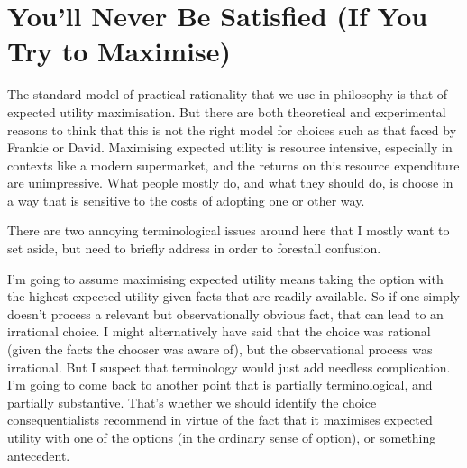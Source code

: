 \documentclass[
  12pt,
  letterpaper,
]{scrbook}
\begin{document}
\section{You'll Never Be Satisfied (If You Try to
Maximise)}\label{sec-satisfied}

The standard model of practical rationality that we use in philosophy is
that of expected utility maximisation. But there are both theoretical
and experimental reasons to think that this is not the right model for
choices such as that faced by Frankie or David. Maximising expected
utility is resource intensive, especially in contexts like a modern
supermarket, and the returns on this resource expenditure are
unimpressive. What people mostly do, and what they should do, is choose
in a way that is sensitive to the costs of adopting one or other way.

There are two annoying terminological issues around here that I mostly
want to set aside, but need to briefly address in order to forestall
confusion.

I'm going to assume maximising expected utility means taking the option
with the highest expected utility given facts that are readily
available. So if one simply doesn't process a relevant but
observationally obvious fact, that can lead to an irrational choice. I
might alternatively have said that the choice was rational (given the
facts the chooser was aware of), but the observational process was
irrational. But I suspect that terminology would just add needless
complication. I'm going to come back to another point that is partially
terminological, and partially substantive. That's whether we should
identify the choice consequentialists recommend in virtue of the fact
that it maximises expected utility with one of the options (in the
ordinary sense of option), or something antecedent.
\end{document}
